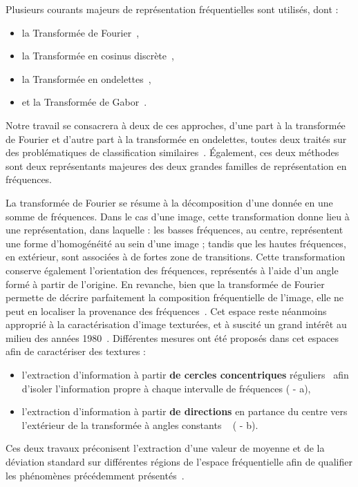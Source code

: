 Plusieurs courants majeurs de représentation fréquentielles sont utilisés, dont : 
\begin{itemize}
    \item la Transformée de Fourier~\cite{Ursani2007, Smach2008a},
    \item la Transformée en cosinus discrète~\cite{Sorwar2001},
    \item la Transformée en ondelettes~\cite{Arivazhagan2003,Hong2010},
    \item et la Transformée de Gabor~\cite{Ursani2007}.
\end{itemize}
Notre travail se consacrera à deux de ces approches, d'une part à la transformée de Fourier et d'autre part à la transformée en ondelettes, toutes deux traités sur des problématiques de classification similaires~\cite{Wiltgen2008,Halimi2017a,Halimi2017b}. Également, ces deux méthodes sont deux représentants majeures des deux grandes familles de représentation en fréquences.\par

La transformée de Fourier se résume à la décomposition d'une donnée en une somme de fréquences. Dans le cas d'une image, cette transformation donne lieu à une représentation, dans laquelle : les basses fréquences, au centre, représentent une forme d'homogénéité au sein d'une image ; tandis que les hautes fréquences, en extérieur, sont associées à de fortes zone de transitions. Cette transformation conserve également l'orientation des fréquences, représentés à l'aide d'un angle formé à partir de l'origine. En revanche, bien que la transformée de Fourier permette de décrire parfaitement la composition fréquentielle de l'image, elle ne peut en localiser la provenance des fréquences~\cite{Wiltgen2008}. Cet espace reste néanmoins approprié à la caractérisation d'image texturées, et à suscité un grand intérêt au milieu des années 1980~\cite{Persoon1986}. Différentes mesures ont été proposés dans cet espaces afin de caractériser des textures :
\begin{itemize}
    \item l'extraction d'information à partir \textbf{de cercles concentriques} réguliers~\cite{Smach2008a, Wiltgen2008} afin d'isoler l'information propre à chaque intervalle de fréquences ( - a),
    \item l'extraction d'information à partir \textbf{de directions} en partance du centre vers l'extérieur de la transformée à angles constants ~\cite{Wiltgen2008} ( - b).
\end{itemize}
Ces deux travaux préconisent l'extraction d'une valeur de moyenne et de la déviation standard sur différentes régions de l'espace fréquentielle afin de qualifier les phénomènes précédemment présentés~\cite{Smach2008a, Wiltgen2008}. 

